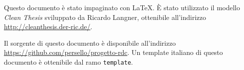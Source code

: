 %
\pagestyle{empty}
\hfill
\vfill

Questo documento è stato impaginato con \LaTeX.
È stato utilizzato il modello \textit{Clean Thesis} sviluppato da Ricardo Langner, ottenibile all'indirizzo \url{http://cleanthesis.der-ric.de/}.

Il sorgente di questo documento è disponibile all'indirizzo \url{https://github.com/persello/progetto-rdc}. Un template italiano di questo documento è ottenibile dal ramo \texttt{template}.
